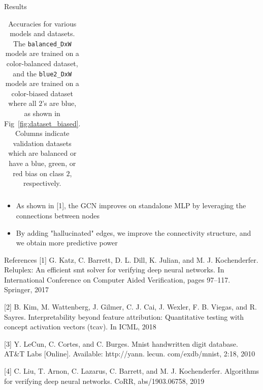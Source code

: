 \documentclass[final]{beamer}
\begin{document}
\begin{frame}[fragile]{}
\begin{textblock}{\colwidth}
\begin{paddedBlock}{Results}
\begin{table}
\begin{tabular}{lcccc}
\end{tabular}
\caption{Accuracies for various models and datasets. The \texttt{balanced\_DxW} models are trained on a color-balanced dataset, and the \texttt{blue2\_DxW} models are trained on a color-biased dataset where all $2$'s are blue, as shown in Fig~\ref{fig:dataset_biased}. Columns indicate validation datasets which are balanced or have a blue, green, or red bias on class $2$, respectively. }
\label{table:accuracies}
\end{table}



\begin{itemize}
  \item As shown in [1], the GCN improves on standalone MLP by leveraging the connections between nodes
  \item By adding "hallucinated" edges, we improve the connectivity structure, and we obtain more predictive power
\end{itemize}

\end{paddedBlock}


\begin{paddedBlock}{References}
\footnotesize{[1] G. Katz, C. Barrett, D. L. Dill, K. Julian, and M. J. Kochenderfer. Reluplex: An efficient smt solver for verifying deep neural networks. In International Conference on Computer Aided Verification, pages 97–117. Springer, 2017}

\footnotesize{[2] B. Kim, M. Wattenberg, J. Gilmer, C. J. Cai, J. Wexler, F. B. Viegas, and R. Sayres. Interpretability beyond feature attribution: Quantitative testing with concept activation vectors (tcav). In ICML, 2018}

\footnotesize{[3] Y. LeCun, C. Cortes, and C. Burges. Mnist handwritten digit database. AT&T Labs [Online]. Available: http://yann. lecun. com/exdb/mnist, 2:18, 2010}

\footnotesize{[4] C. Liu, T. Arnon, C. Lazarus, C. Barrett, and M. J. Kochenderfer. Algorithms for verifying deep neural networks. CoRR, abs/1903.06758, 2019}

\end{paddedBlock}
\end{textblock}






\end{frame}
\end{document}
